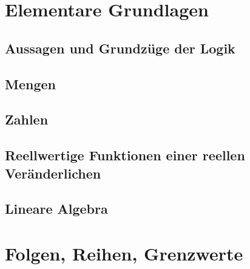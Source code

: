 




\maketitle
\newpage
\tableofcontents
\newpage

\chapter{Elementare Grundlagen}

\section{Aussagen und Grundzüge der Logik}
%

\section{Mengen}\label{sec:Mengen}
%

\section{Zahlen}
%

\section{Reellwertige Funktionen einer reellen Veränderlichen}
%

\section{Lineare Algebra}
%

\newpage
\chapter{Folgen, Reihen, Grenzwerte}
%

